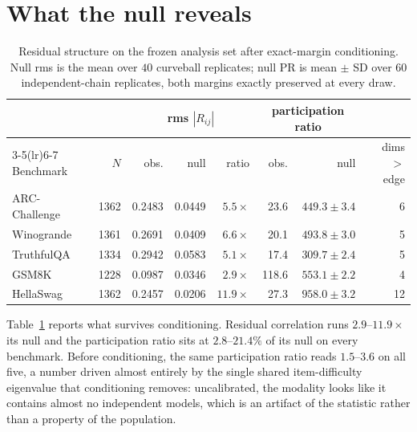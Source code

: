 \documentclass{article}
\begin{document}
\section{What the null reveals}
\label{sec:structure}

\begin{table}[t]\centering\small
\begin{tabular}{lrrrrrrr}
\toprule
& & \multicolumn{3}{c}{rms $|R_{ij}|$} & \multicolumn{2}{c}{participation ratio} & \\
\cmidrule(lr){3-5}\cmidrule(lr){6-7}
Benchmark & $N$ & obs. & null & ratio & obs. & null & dims $>$ edge \\
\midrule
ARC-Challenge & 1362 & 0.2483 & 0.0449 & $5.5\times$ & 23.6 & $449.3\pm3.4$ & 6 \\
Winogrande & 1361 & 0.2691 & 0.0409 & $6.6\times$ & 20.1 & $493.8\pm3.0$ & 5 \\
TruthfulQA & 1334 & 0.2942 & 0.0583 & $5.1\times$ & 17.4 & $309.7\pm2.4$ & 5 \\
GSM8K & 1228 & 0.0987 & 0.0346 & $2.9\times$ & 118.6 & $553.1\pm2.2$ & 4 \\
HellaSwag & 1362 & 0.2457 & 0.0206 & $11.9\times$ & 27.3 & $958.0\pm3.2$ & 12 \\
\bottomrule
\end{tabular}
\caption{Residual structure on the frozen analysis set after exact-margin conditioning. Null rms is
the mean over $40$ curveball replicates; null PR is mean $\pm$ SD over $60$ independent-chain
replicates, both margins exactly preserved at every draw.}
\label{tab:structure}
\end{table}

Table~\ref{tab:structure} reports what survives conditioning. Residual correlation runs
$2.9$--$11.9\times$ its null and the participation ratio sits at $2.8$--$21.4\%$ of its null on
every benchmark. Before conditioning, the same participation ratio reads $1.5$--$3.6$ on all five,
a number driven almost entirely by the single shared item-difficulty eigenvalue that conditioning
removes: uncalibrated, the modality looks like it contains almost no independent models, which is
an artifact of the statistic rather than a property of the population.
\end{document}
